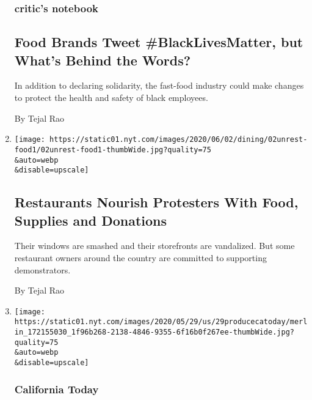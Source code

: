 \begin{enumerate}
  \hypertarget{critics-notebook-3}{%
  \subsubsection{critic's notebook}\label{critics-notebook-3}}

  \hypertarget{food-brands-tweet-blacklivesmatter-but-whats-behind-the-words}{%
  \subsection{Food Brands Tweet \#BlackLivesMatter, but What's Behind
  the
  Words?}\label{food-brands-tweet-blacklivesmatter-but-whats-behind-the-words}}

  In addition to declaring solidarity, the fast-food industry could make
  changes to protect the health and safety of black employees.

  By Tejal Rao
\item
  \href{/2020/06/02/dining/restaurant-response-floyd-protests.html}{}

  \texttt{[image: https://static01.nyt.com/images/2020/06/02/dining/02unrest-food1/02unrest-food1-thumbWide.jpg?quality=75\\\&auto=webp\\\&disable=upscale]}

  \hypertarget{restaurants-nourish-protesters-with-food-supplies-and-donations}{%
  \subsection{Restaurants Nourish Protesters With Food, Supplies and
  Donations}\label{restaurants-nourish-protesters-with-food-supplies-and-donations}}

  Their windows are smashed and their storefronts are vandalized. But
  some restaurant owners around the country are committed to supporting
  demonstrators.

  By Tejal Rao
\item
  \href{/2020/05/29/us/california-local-produce-recipes.html}{}

  \texttt{[image: https://static01.nyt.com/images/2020/05/29/us/29producecatoday/merlin\_172155030\_1f96b268-2138-4846-9355-6f16b0f267ee-thumbWide.jpg?quality=75\\\&auto=webp\\\&disable=upscale]}

  \hypertarget{california-today}{%
  \subsubsection{California Today}\label{california-today}}


\end{enumerate}
